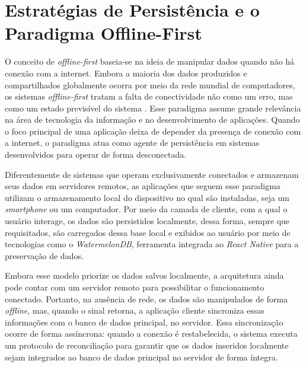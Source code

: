 \section{Estratégias de Persistência e o Paradigma Offline-First}
\label{sec:fundamentacao-teorica-a}
O conceito de \textit{offline-first} baseia-se na ideia de manipular dados quando não há conexão com a internet. Embora a maioria dos dados produzidos e compartilhados globalmente ocorra por meio da rede mundial de computadores, os sistemas \textit{offline-first} tratam a falta de conectividade não como um erro, mas como um estado previsível do sistema \cite{kleppmann2019}. Esse paradigma assume grande relevância na área de tecnologia da informação e no desenvolvimento de aplicações. Quando o foco principal de uma aplicação deixa de depender da presença de conexão com a internet, o paradigma atua como agente de persistência em sistemas desenvolvidos para operar de forma desconectada.

Diferentemente de sistemas que operam exclusivamente conectados e armazenam seus dados em servidores remotos, as aplicações que seguem esse paradigma utilizam o armazenamento local do dispositivo no qual são instaladas, seja um \textit{smartphone} ou um computador. Por meio da camada de cliente, com a qual o usuário interage, os dados são persistidos localmente, dessa forma, sempre que requisitados, são carregados dessa base local e exibidos ao usuário por meio de tecnologias como o \textit{WatermelonDB}, ferramenta integrada ao \textit{React Native} para a preservação de dados.

Embora esse modelo priorize os dados salvos localmente, a arquitetura ainda pode contar com um servidor remoto para possibilitar o funcionamento conectado. Portanto, na ausência de rede, os dados são manipulados de forma \textit{offline}, mas, quando o sinal retorna, a aplicação cliente sincroniza essas informações com o banco de dados principal, no servidor. Essa sincronização ocorre de forma assíncrona: quando a conexão é restabelecida, o sistema executa um protocolo de reconciliação para garantir que os dados inseridos localmente sejam integrados ao banco de dados principal no servidor de forma íntegra.

